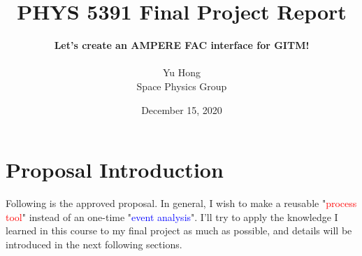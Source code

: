 \documentclass[12pt, letterpaper]{article} %
\begin{document}
\title{PHYS 5391 Final Project Report} %
\author{\textbf{Let’s create an AMPERE FAC interface for GITM!} \\ \ \\Yu Hong\\Space Physics Group} %
\date{December 15, 2020}  %
\maketitle %
\newpage %
\tableofcontents %
\newpage %


\section{Proposal Introduction} %

\noindent Following is the approved proposal. In general, I wish to make a reusable "\textcolor{red}{process tool}" instead of an one-time "\textcolor{blue}{event analysis}". I'll try to apply the knowledge I learned in this course to my final project as much as possible, and details will be introduced in the next following sections.
\end{document}
